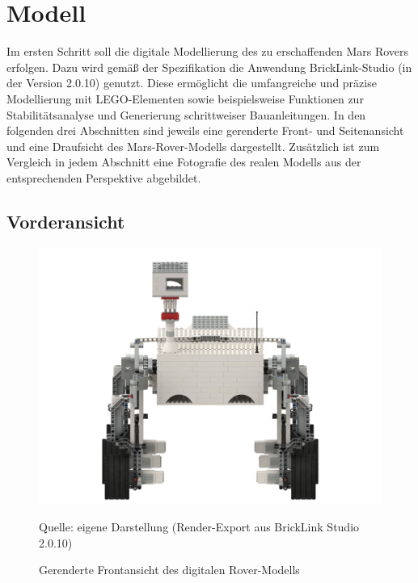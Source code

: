 \chapter{Modell}
\label{chp:modell}

Im ersten Schritt soll die digitale Modellierung des zu erschaffenden Mars Rovers erfolgen.
Dazu wird gemäß der Spezifikation die Anwendung BrickLink-Studio (in der Version 2.0.10) genutzt.
Diese ermöglicht die umfangreiche und präzise Modellierung mit LEGO-Elementen sowie beispielsweise Funktionen zur Stabilitätsanalyse und Generierung schrittweiser Bauanleitungen.
In den folgenden drei Abschnitten sind jeweils eine gerenderte Front- und Seitenansicht und eine Draufsicht des Mars-Rover-Modells dargestellt.
Zusätzlich ist zum Vergleich in jedem Abschnitt eine Fotografie des realen Modells aus der entsprechenden Perspektive abgebildet.

\section{Vorderansicht}
\label{sec:voderansicht}

\begin{figure}
	\centering
	\includegraphics[width=\textwidth]{../Images/20200429_Mars_Rover_V5_front.png}
	\vspace{0.5em}
	\parbox[c]{0.8\linewidth}{\footnotesize
		\centering
		\vspace{1em}
		Quelle: eigene Darstellung (Render-Export aus BrickLink Studio 2.0.10)
	}
	\caption{Gerenderte Frontansicht des digitalen Rover-Modells}
	\label{fig:roverfrontrender}
\end{figure}

